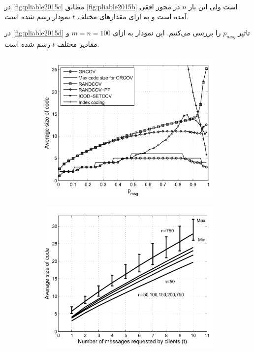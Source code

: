                 در
                \autoref{fig:pliable2015c}
                مطابق
                  \autoref{fig:pliable2015b}
                  است ولی این بار
                  $n$
                  در محور افقی آمده است و به ازای مقدارهای مختلف
                  $t$
                  نمودار رسم شده است.
                  
                  در
                    \autoref{fig:pliable2015d}
                    تاثیر
                    $p_{msg}$
                    را بررسی می‌کنیم. این نمودار به ازای
                    $m = n = 100$
                    و مقادیر مختلف
                    $t$
                    رسم شده است.
  \begin{figure}
  	\centering
	\begin{subfigure}[b]{0.45\textwidth}
			\centering
  	\includegraphics[width=\textwidth]{figs/ch3/pliable2015_a}
			\caption{}
			\label{fig:pliable2015a}
		\end{subfigure}
		\hfill
		  \begin{subfigure}[b]{0.45\textwidth}
			\centering
			\includegraphics[width=\textwidth]{figs/ch3/pliable2015_b}

\end{subfigure}
\end{figure}
